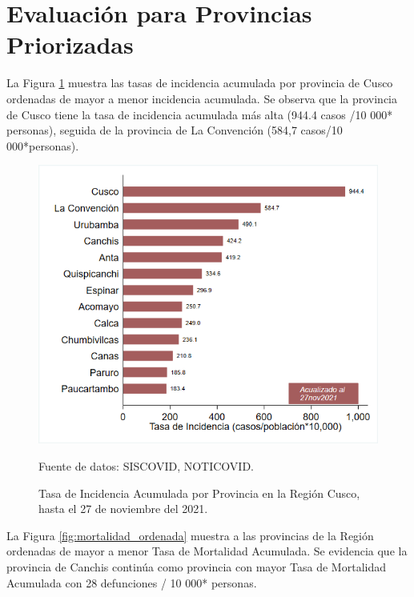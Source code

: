 \documentclass[12pt,a4paper,openany]{book}
\begin{document}

\clearpage

	\section*{Evaluación para Provincias Priorizadas}
\noindent La Figura \ref{fig:incidencia_provincias} muestra las tasas de incidencia acumulada por provincia de Cusco ordenadas de mayor a menor incidencia acumulada. Se observa que la provincia de Cusco tiene la tasa de incidencia acumulada más alta (944.4 casos /10 000* personas), seguida de la provincia de La Convención (584,7 casos/10 000*personas).

\begin{figure}[!htpb]
	\caption{Tasa de Incidencia Acumulada por Provincia en la Región Cusco, hasta el 27 de noviembre del 2021. }\label{fig:incidencia_provincias}
	\begin{center}
		\includegraphics[width=0.75\linewidth]{../figuras/incidencia_provincial}
	\end{center}
	{\footnotesize {Fuente de datos: SISCOVID, NOTICOVID.}}
\end{figure}


La Figura \ref{fig:mortalidad_ordenada} muestra a las provincias de la Región ordenadas de mayor a menor Tasa de Mortalidad Acumulada. Se evidencia que la provincia de Canchis continúa como provincia con mayor Tasa de Mortalidad Acumulada con 28 defunciones / 10 000* personas.  
\end{document}
